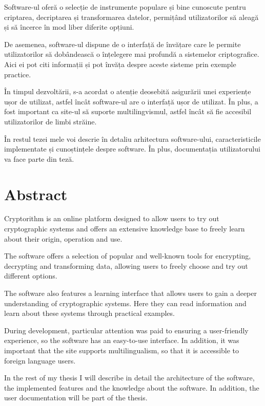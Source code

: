 Software-ul oferă o selecție de instrumente populare și bine cunoscute pentru criptarea, decriptarea și transformarea datelor, permițând utilizatorilor să aleagă și să încerce în mod liber diferite opțiuni.

De asemenea, software-ul dispune de o interfață de învățare care le permite utilizatorilor să dobândească o înțelegere mai profundă a sistemelor criptografice. Aici ei pot citi informații și pot învăța despre aceste sisteme prin exemple practice. 

În timpul dezvoltării, s-a acordat o atenție deosebită asigurării unei experiențe ușor de utilizat, astfel încât software-ul are o interfață ușor de utilizat. În plus, a fost important ca site-ul să suporte multilingvismul, astfel încât să fie accesibil utilizatorilor de limbi străine.

În restul tezei mele voi descrie în detaliu arhitectura software-ului, caracteristicile implementate și cunoștințele despre software. În plus, documentația utilizatorului va face parte din teză.

\vfill
{}

\chapter*{Abstract}

Cryptorithm is an online platform designed to allow users to try out cryptographic systems and offers an extensive knowledge base to freely learn about their origin, operation and use.

The software offers a selection of popular and well-known tools for encrypting, decrypting and transforming data, allowing users to freely choose and try out different options.

The software also features a learning interface that allows users to gain a deeper understanding of cryptographic systems. Here they can read information and learn about these systems through practical examples. 

During development, particular attention was paid to ensuring a user-friendly experience, so the software has an easy-to-use interface. In addition, it was important that the site supports multilingualism, so that it is accessible to foreign language users.

In the rest of my thesis I will describe in detail the architecture of the software, the implemented features and the knowledge about the software. In addition, the user documentation will be part of the thesis.

\vfill
\dolgozatnyelve
{}